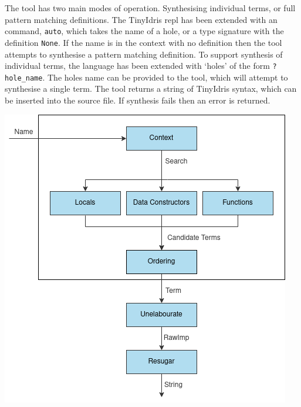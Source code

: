 \documentclass[a4paper]{article}
\newenvironment{Figure}
  {\par\medskip\noindent\minipage{\linewidth}}
  {\endminipage\par\medskip}
\begin{document}
The tool has two main modes of operation. Synthesising individual terms, or full pattern matching 
definitions. The TinyIdris repl has been extended with an command, \texttt{auto}, which takes the name of a hole, or a type signature with the definition \texttt{None}.
If the name is in the context with no definition then the tool attempts to synthesise a pattern matching definition. 
To support synthesis of individual terms, the language has been extended with `holes' of the form \texttt{?hole\_name}.
The holes name can be provided to the tool, which will attempt to synthesise a single term.
The tool returns a string of TinyIdris syntax, which can be
inserted into the source file. If synthesis fails then an error is returned. 

\begin{multicols}{2}
\begin{Figure}
\centering
\includegraphics[scale=0.55]{./Resource/syn.png}
\end{Figure}


\end{multicols}
\end{document}
